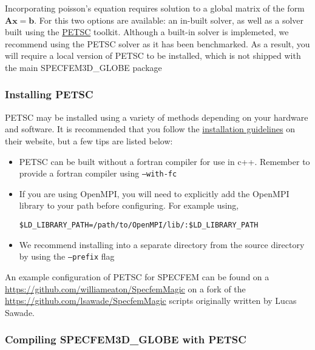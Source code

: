 Incorporating poisson's equation requires solution to a global matrix of the form $\mathbf{A}\mathbf{x} = \mathbf{b}$. 
For this two options are available: an in-built solver, as well as a solver built using the \href{http://petsc.org/release/}{PETSC} toolkit. 
Although a built-in solver is implemeted, we recommend using the PETSC solver as it has been benchmarked. As a result, 
you will require a local version of PETSC to be installed, which is not shipped with the main SPECFEM3D\_GLOBE package 


\subsubsection{Installing PETSC}
 
 PETSC may be installed using a variety of methods depending on your hardware and software. It is recommended that you follow
 the \href{https://petsc.org/release/install/}{installation guidelines} on their website, but a few tips are listed below: 
 
 \begin{itemize}
     \item PETSC can be built without a fortran compiler for use in c++. Remember to provide a fortran compiler using \texttt{--with-fc} 
     \item If you are using OpenMPI, you will need to explicitly add the OpenMPI library to your path before configuring. For example using, 
     \begin{verbatim}
$LD_LIBRARY_PATH=/path/to/OpenMPI/lib/:$LD_LIBRARY_PATH
     \end{verbatim}
     \item We recommend installing into a separate directory from the source directory by using the \texttt{--prefix} flag
 \end{itemize}


 An example configuration of PETSC for SPECFEM can be found on a \href{here}{https://github.com/williameaton/SpecfemMagic} 
 on a fork of the \href{SpecfemMagic}{https://github.com/lsawade/SpecfemMagic} scripts originally written by Lucas Sawade. 
 
 
 \subsubsection{Compiling SPECFEM3D\_GLOBE with PETSC}
 
